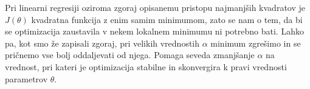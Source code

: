 Pri linearni regresiji oziroma zgoraj opisanemu pristopu najmanjših kvadratov je $J(\theta)$ kvadratna funkcija z enim samim minimumom, zato se nam o tem, da bi se optimizacija zaustavila v nekem lokalnem minimumu ni potrebno bati. Lahko pa, kot smo že zapisali zgoraj, pri velikih vrednostih $\alpha$ minimum zgrešimo in se pričnemo vse bolj oddaljevati od njega. Pomaga seveda zmanjšanje $\alpha$ na vrednost, pri kateri je optimizacija stabilne in skonvergira k pravi vrednosti parametrov $\theta$.
